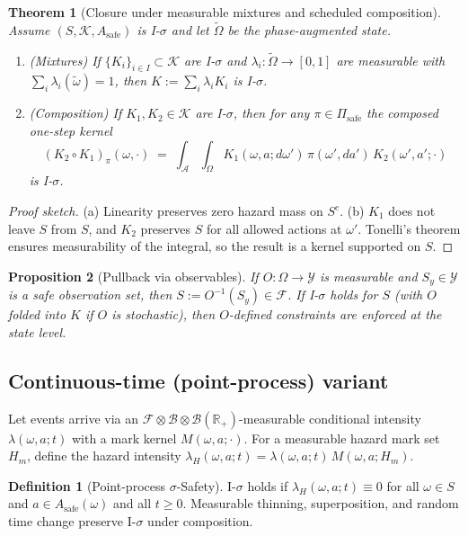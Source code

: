 \documentclass[11pt]{article}
\theoremstyle{plain}
\newtheorem{theorem}{Theorem}
\newtheorem{proposition}[theorem]{Proposition}
\theoremstyle{definition}
\newtheorem{definition}{Definition}
\theoremstyle{remark}
\newcommand{\A}{\mathcal{A}}
\newcommand{\F}{\mathcal{F}}
\newcommand{\Y}{\mathcal{Y}}
\newcommand{\B}{\mathcal{B}}
\newcommand{\K}{\mathcal{K}}
\begin{document}
\begin{theorem}[Closure under measurable mixtures and scheduled composition]
\label{thm:closure}
Assume $(S,\K,A_{\mathrm{safe}})$ is I-$\sigma$ and let $\tilde\Omega$ be the phase-augmented state.
\begin{enumerate}[label=(\alph*), leftmargin=1.6em]
\item (Mixtures) If $\{K_i\}_{i\in I}\subset \K$ are I-$\sigma$ and $\lambda_i:\tilde\Omega\to[0,1]$ are measurable with $\sum_i \lambda_i(\tilde\omega)=1$, then $K:=\sum_i \lambda_i K_i$ is I-$\sigma$.
\item (Composition) If $K_1,K_2\in \K$ are I-$\sigma$, then for any $\pi\in\Pi_{\mathrm{safe}}$ the composed one-step kernel
\[
(K_2\circ K_1)_\pi(\omega,\cdot)\;=\;\int_{\A} \int_{\Omega} K_1(\omega,a;d\omega')\, \pi(\omega',da')\, K_2(\omega',a';\cdot)
\]
is I-$\sigma$.
\end{enumerate}
\end{theorem}

\begin{proof}[Proof sketch]
(a) Linearity preserves zero hazard mass on $S^c$. (b) $K_1$ does not leave $S$ from $S$, and $K_2$ preserves $S$ for all allowed actions at $\omega'$. Tonelli's theorem ensures measurability of the integral, so the result is a kernel supported on $S$. \qedhere
\end{proof}

\begin{proposition}[Pullback via observables]
\label{prop:pullback}
If $O:\Omega\to \Y$ is measurable and $S_y\in\mathcal{Y}$ is a safe observation set, then $S:=O^{-1}(S_y)\in\F$. If I-$\sigma$ holds for $S$ (with $O$ folded into $K$ if $O$ is stochastic), then $O$-defined constraints are enforced at the state level.
\end{proposition}

\subsection{Continuous-time (point-process) variant}

Let events arrive via an $\F\otimes\B\otimes \B(\mathbb{R}_+)$-measurable conditional intensity $\lambda(\omega,a;t)$ with a mark kernel $M(\omega,a;\cdot)$. For a measurable hazard mark set $H_m$, define the hazard intensity $\lambda_H(\omega,a;t)=\lambda(\omega,a;t)\,M(\omega,a;H_m)$.

\begin{definition}[Point-process $\sigma$-Safety]
I-$\sigma$ holds if $\lambda_H(\omega,a;t)\equiv 0$ for all $\omega\in S$ and $a\in A_{\mathrm{safe}}(\omega)$ and all $t\ge 0$. Measurable thinning, superposition, and random time change preserve I-$\sigma$ under composition.
\end{definition}
\end{document}

